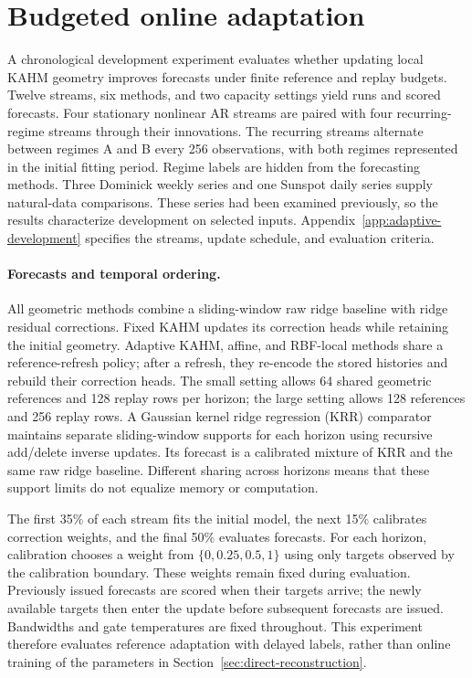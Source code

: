 \section{Budgeted online adaptation}
\label{sec:adaptive-development}


A chronological development experiment evaluates whether updating local
KAHM geometry improves forecasts under finite reference and replay
budgets. Twelve streams, six methods, and two capacity settings yield
\ADRunCount{} runs and \ADForecastCount{} scored forecasts. Four
stationary nonlinear AR streams are paired with four recurring-regime
streams through their innovations. The recurring streams alternate
between regimes A and B every 256 observations, with both regimes
represented in the initial fitting period. Regime labels are hidden
from the forecasting methods. Three Dominick weekly series and one
Sunspot daily series supply natural-data comparisons. These series had
been examined previously, so the results characterize development on
selected inputs. Appendix~\ref{app:adaptive-development} specifies the
streams, update schedule, and evaluation criteria.

\paragraph{Forecasts and temporal ordering.}
All geometric methods combine a sliding-window raw ridge baseline with
ridge residual corrections. Fixed KAHM updates its correction heads while
retaining the initial geometry. Adaptive KAHM, affine, and RBF-local
methods share a reference-refresh policy; after a refresh, they re-encode
the stored histories and rebuild their correction heads. The small
setting allows 64 shared geometric references and 128 replay rows per
horizon; the large setting allows 128 references and 256 replay rows.
A Gaussian kernel ridge regression (KRR) comparator maintains separate
sliding-window supports for each horizon using recursive add/delete
inverse updates. Its forecast is a calibrated mixture of KRR and the
same raw ridge baseline. Different sharing across horizons means that
these support limits do not equalize memory or computation.

The first 35\% of each stream fits the initial model, the next 15\%
calibrates correction weights, and the final 50\% evaluates forecasts.
For each horizon, calibration chooses a weight from
$\{0,0.25,0.5,1\}$ using only targets observed by the calibration
boundary. These weights remain fixed during evaluation. Previously
issued forecasts are scored when their targets arrive; the newly
available targets then enter the update before subsequent forecasts
are issued. Bandwidths and gate temperatures are fixed throughout.
This experiment therefore evaluates reference adaptation with delayed
labels, rather than online training of the parameters in
Section~\ref{sec:direct-reconstruction}.

